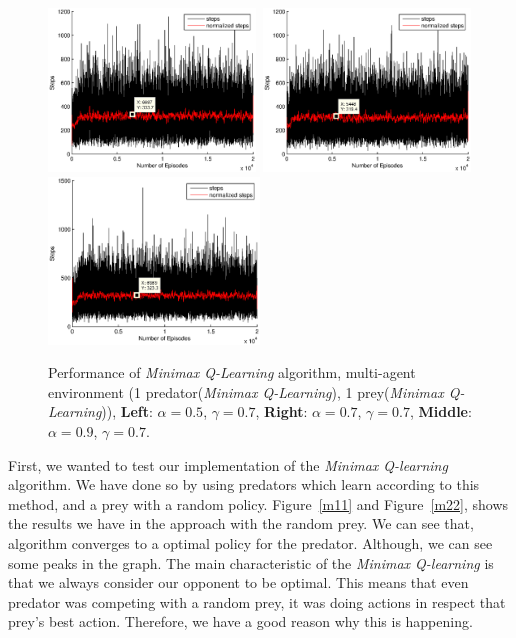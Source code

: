 \documentclass[a4paper,11pt]{article}
\begin{document}
\begin{figure}[h]
\begin{center}
    \includegraphics[width=0.49\textwidth]{figures/mm05.eps}\	
    \includegraphics[width=0.49\textwidth]{figures/mm07.eps}\\
    \includegraphics[width=0.5\textwidth]{figures/mm09.eps}
    \caption{Performance of  \textit{Minimax Q-Learning} algorithm, multi-agent environment (1 predator(\textit{Minimax Q-Learning}), 1 prey(\textit{Minimax Q-Learning})), \textbf{Left}: $\alpha = 0.5$, $\gamma = 0.7$, \textbf{Right}: $\alpha = 0.7$, $\gamma = 0.7$, \textbf{Middle}: $\alpha = 0.9$, $\gamma = 0.7$.}
    \label{m13}
\end{center}
\end{figure}

First, we wanted to test our implementation of the \textit{Minimax Q-learning} algorithm. We have done so by using predators which learn according to this method, and a prey with a random policy. Figure~\ref{m11} and Figure~\ref{m22}, shows the results we have in the approach with the random prey. We can see that, algorithm converges to a optimal policy for the predator. Although, we can see some peaks in the graph. The main characteristic of the \textit{Minimax Q-learning} is that we always consider our opponent to be optimal. This means that even predator was competing with a random prey, it was doing actions in respect that prey's best action. Therefore, we have a good reason why this is happening.
\end{document}
